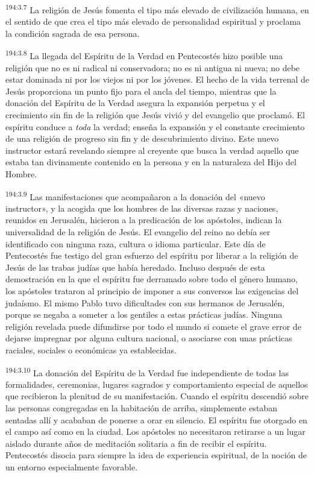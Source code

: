 \par 
\textsuperscript{194:3.7} La religión de Jesús fomenta el tipo más elevado de civilización humana, en el sentido de que crea el tipo más elevado de personalidad espiritual y proclama la condición sagrada de esa persona.

\par 
\textsuperscript{194:3.8} La llegada del Espíritu de la Verdad en Pentecostés hizo posible una religión que no es ni radical ni conservadora; no es ni antigua ni nueva; no debe estar dominada ni por los viejos ni por los jóvenes. El hecho de la vida terrenal de Jesús proporciona un punto fijo para el ancla del tiempo, mientras que la donación del Espíritu de la Verdad asegura la expansión perpetua y el crecimiento sin fin de la religión que Jesús vivió y del evangelio que proclamó. El espíritu conduce a \textit{toda} la verdad; enseña la expansión y el constante crecimiento de una religión de progreso sin fin y de descubrimiento divino. Este nuevo instructor estará revelando siempre al creyente que busca la verdad aquello que estaba tan divinamente contenido en la persona y en la naturaleza del Hijo del Hombre.

\par 
\textsuperscript{194:3.9} Las manifestaciones que acompañaron a la donación del «nuevo instructor», y la acogida que los hombres de las diversas razas y naciones, reunidos en Jerusalén, hicieron a la predicación de los apóstoles, indican la universalidad de la religión de Jesús. El evangelio del reino no debía ser identificado con ninguna raza, cultura o idioma particular. Este día de Pentecostés fue testigo del gran esfuerzo del espíritu por liberar a la religión de Jesús de las trabas judías que había heredado. Incluso después de esta demostración en la que el espíritu fue derramado sobre todo el género humano, los apóstoles trataron al principio de imponer a sus conversos las exigencias del judaísmo. El mismo Pablo tuvo dificultades con sus hermanos de Jerusalén, porque se negaba a someter a los gentiles a estas prácticas judías. Ninguna religión revelada puede difundirse por todo el mundo si comete el grave error de dejarse impregnar por alguna cultura nacional, o asociarse con unas prácticas raciales, sociales o económicas ya establecidas.

\par 
\textsuperscript{194:3.10} La donación del Espíritu de la Verdad fue independiente de todas las formalidades, ceremonias, lugares sagrados y comportamiento especial de aquellos que recibieron la plenitud de su manifestación. Cuando el espíritu descendió sobre las personas congregadas en la habitación de arriba, simplemente estaban sentadas allí y acababan de ponerse a orar en silencio. El espíritu fue otorgado en el campo así como en la ciudad. Los apóstoles no necesitaron retirarse a un lugar aislado durante años de meditación solitaria a fin de recibir el espíritu. Pentecostés disocia para siempre la idea de experiencia espiritual, de la noción de un entorno especialmente favorable.

